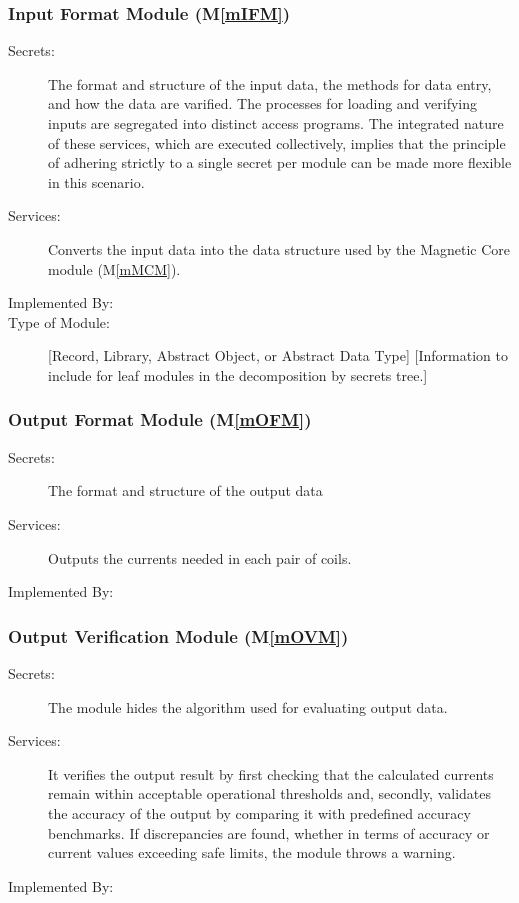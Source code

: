 \documentclass[12pt, titlepage]{article}
\newcommand{\mref}[1]{M\ref{#1}}
\begin{document}
\subsubsection{Input Format Module (\mref{mIFM})}

\begin{description}
\item[Secrets:]The format and structure of the input data, the methods for data entry, and how the data are varified. The processes for loading and verifying inputs are segregated into distinct access programs. The integrated nature of these services, which are executed collectively, implies that the principle of adhering strictly to a single secret per module can be made more flexible in this scenario.
\item[Services:]Converts the input data into the data structure used by the
  Magnetic Core module (\mref{mMCM}).
\item[Implemented By:] \progname 
\item[Type of Module:] [Record, Library, Abstract Object, or Abstract Data Type]
  [Information to include for leaf modules in the decomposition by secrets tree.]
\end{description}


\subsubsection{Output Format Module (\mref{mOFM})}

\begin{description}
\item[Secrets:]The format and structure of the output data
\item[Services:]Outputs the currents needed in each pair of coils.
\item[Implemented By:] \progname 
\end{description}

\subsubsection{Output Verification Module (\mref{mOVM})}

\begin{description}
\item[Secrets:]The module hides the algorithm used for evaluating output data.
\item[Services:]It verifies the output result by first checking that the calculated currents remain within acceptable operational thresholds and, secondly, validates the accuracy of the output by comparing it with predefined accuracy benchmarks. If discrepancies are found, whether in terms of accuracy or current values exceeding safe limits, the module throws a warning.
\item[Implemented By:] \progname 
\end{description}
\end{document}
